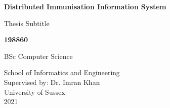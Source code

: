 \begin{titlepage}
    \begin{center}
        \vspace*{1cm}
        
        \Huge
        \textbf{Distributed Immunisation Information System}
        
        \vspace{0.5cm}
        \LARGE
        Thesis Subtitle
        
        \vspace{1.5cm}
        
        \textbf{198860}
        
        \vfill
        
        BSc Computer Science
        
        \vspace{0.8cm}
        
        \Large
        School of Informatics and Engineering\\
        Supervised by: Dr. Imran Khan\\
        University of Sussex\\
        2021
    \end{center}
\end{titlepage}
